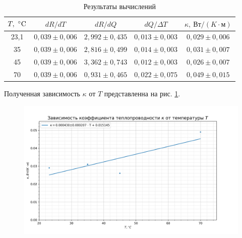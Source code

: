 \documentclass[a4paper, 12pt]{article}
\begin{document}
\newpage

\begin{table}[h!]
\begin{center}
\begin{tabular}{|c|c|c|c|c|}
\hline 
$T,~\celsius$ & $dR/dT$ & $dR/dQ$ & $dQ/\Delta{T}$ & $\kappa,~Вт/(K \cdot м) $ \\ 
\hline 
23,1 & $0,039\pm0,006$ & $2,992\pm0,435$ & $0,013\pm0,003$ & $0,029\pm0,006$ \\ 
\hline 
35 & $0,039\pm0,006$ & $2,816\pm0,499$ & $0,014\pm0,003$ & $0,031\pm0,007$ \\ 
\hline 
45 & $0,039\pm0,006$ & $3,362\pm0,743$ & $0,012\pm0,003$ & $0,026\pm0,007$ \\ 
\hline 
70 & $0,039\pm0,006$ & $0,931\pm0,465$ & $0,022\pm0,075$ & $0,049\pm0,015$ \\ 
\hline 
\end{tabular} 
\caption{Результаты вычислений}
\label{tab5}
\end{center}
\end{table}

Полученная зависимость $\kappa$ от $T$ представленна на рис. \ref{ris5}.
\begin{figure}[h!]
\begin{flushleft}
    \includegraphics[scale=0.75]{2.2.3_3.png}
\end{flushleft}
\caption{}
\label{ris5}
\end{figure}
\end{document}
